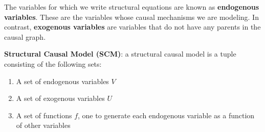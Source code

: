 The variables for which we write structural equations are known as
\textbf{endogenous variables}. These are the variables whose causal
mechanisms we are modeling.
In contrast, \textbf{exogenous variables} are variables that
do not have any parents in the causal graph.

\textbf{Structural Causal Model (SCM)}: a structural causal model
is a tuple consisting of the following sets:
\begin{enumerate}
    \item A set of endogenous variables \( V \)
    \item A set of exogenous variables \( U \)
    \item A set of functions \( f \), one to generate each
    endogenous variable as a function of other variables
\end{enumerate}